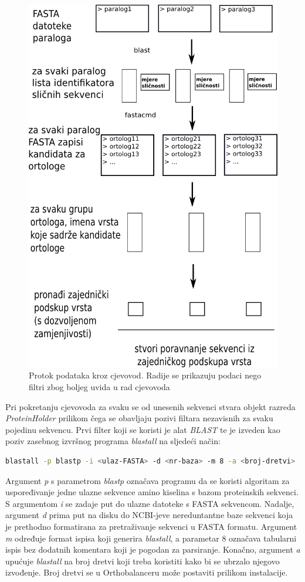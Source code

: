 \begin{figure}[h!]
\centering
\includegraphics[width=4.5in]{figures/cjevovod.png}
\caption{Protok podataka kroz cjevovod. Radije se prikazuju podaci nego filtri
zbog boljeg uvida u rad cjevovoda}
\label{fig:cjevovod}
\end{figure}

Pri pokretanju cjevovoda za svaku se od unesenih sekvenci stvara objekt razreda
\emph{ProteinHolder} prilikom čega se obavljaju pozivi filtara nezavisnih za
svaku pojedinu sekvencu. Prvi filter koji se koristi je alat
\emph{BLAST}\cite{altschul1997gapped} te je izveden kao poziv zasebnog izvršnog
programa \emph{blastall} na sljedeći način:

\begin{lstlisting}[language=bash]
blastall -p blastp -i <ulaz-FASTA> -d <nr-baza> -m 8 -a <broj-dretvi>
\end{lstlisting}

Argument \emph{p} s parametrom \emph{blastp} označava programu da se koristi
algoritam za uspoređivanje jedne ulazne sekvence amino kiselina s bazom
proteinskih sekvenci. S argumentom \emph{i} se zadaje put do ulazne datoteke s
FASTA sekvencom. Nadalje, argument \emph{d} prima put na disku do NCBI-jeve 
nereduntantne baze sekvenci koja je prethodno formatirana za pretraživanje
sekvenci u FASTA formatu. Argument \emph{m} određuje format ispisa koji generira
\emph{blastall}, a parametar 8 označava tabularni ispis bez dodatnih komentara
koji je pogodan za parsiranje. Konačno, argument \emph{a} upućuje
\emph{blastall} na broj dretvi koji treba koristiti kako bi se ubrzalo njegovo
izvođenje. Broj dretvi se u Orthobalanceru može postaviti prilikom instalacije.

